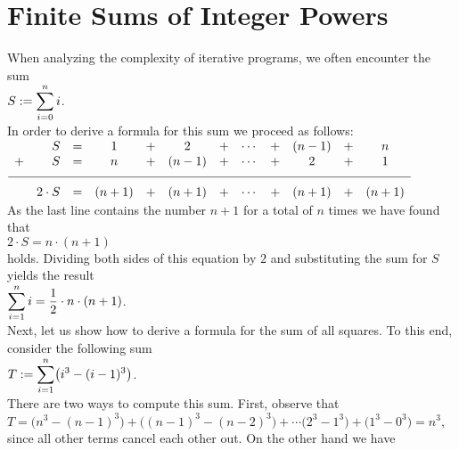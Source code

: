 \section{Finite Sums of Integer Powers}
When analyzing the complexity of iterative programs, we often encounter the sum
\\[0.2cm]
\hspace*{1.3cm}
$\displaystyle S := \sum\limits_{i=0}^n i$.
\\[0.2cm]
In order to derive a formula for this sum we proceed as follows:
\\[0.2cm]
\hspace*{1.3cm}
$
\begin{array}{lrcccccccccc}
    & S & = & 1 & + &   2   & + & \cdots & + & (n-1)& + & n  \\
  + & S & = & n & + & (n-1) & + & \cdots & + &   2  & + & 1  \\[0.2cm]
  \hline\\[-0.2cm]
    & 2\cdot S & = & (n+1) & + & (n+1) & + & \cdots & + & (n+1) & + & (n+1)
\end{array}
$
\\[0.2cm]
As the last line contains the number $n+1$ for a total of $n$ times we have found that
\\[0.2cm]
\hspace*{1.3cm}
$2 \cdot S = n \cdot (n+1)$
\\[0.2cm]
holds.  Dividing both sides of this equation by $2$ and substituting the sum for $S$ yields the result
\\[0.2cm]
\hspace*{1.3cm}
$\displaystyle\sum\limits_{i=1}^n i = \frac{1}{2} \cdot n \cdot (n+1)$.
\\[0.2cm]
Next, let us show how to derive a formula for the sum of all squares.  To this end, consider the following sum
\\[0.2cm]
\hspace*{1.3cm}
$\displaystyle T := \sum\limits_{i=1}^n \bigl(i^3 - (i-1)^3\bigr)$.
\\[0.2cm]
There are two ways to compute this sum.  First, observe that 
\\[0.2cm]
\hspace*{1.3cm}
$T = \bigl(n^3 - (n-1)^3\bigr) + \bigl((n-1)^3 - (n-2)^3\bigr) + \cdots
    \bigl(2^3 - 1^3\bigr) + \bigl(1^3 - 0^3\bigr) = n^3$,
\\[0.2cm]
since all other terms cancel each other out.  On the other hand we have
\\[0.2cm]
\hspace*{1.3cm}
